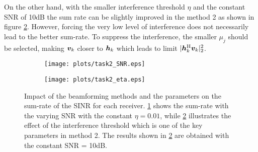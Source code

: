 \documentclass[10pt,a4paper]{article}
\begin{document}
On the other hand, with the smaller interference threshold $\eta$ and the constant SNR of 10dB the sum rate can be slightly improved in the method 2 as shown in figure \ref{fig:task2_eta}. However, forcing the very low level of interference does not necessarily lead to the better sum-rate. To suppress the interference, the smaller $\mu_{j}$ should be selected, making $\bm{v}_{k}$ closer to $\bm{h}_{k}$ which leads to limit $\vert \bm{h}_{k}^{\operatorname{H}} \bm{v}_k \vert_2^{2} $.

\begin{figure}[ht]
	\begin{subfigure}{.5\textwidth}
		\centering
		\texttt{[image: plots/task2\_SNR.eps]}
		\caption{ }
		\label{fig:task2_SNR}
	\end{subfigure}
	\begin{subfigure}{.5\textwidth}
		\centering
		\texttt{[image: plots/task2\_eta.eps]}
		\caption{ }
		\label{fig:task2_eta}
	\end{subfigure}
\caption{Impact of the beamforming methods and the parameters on the sum-rate of the SINR for each receiver. \ref{fig:task2_SNR} shows the sum-rate with the varying SNR with the constant $\eta = 0.01$, while \ref{fig:task2_eta} illustrates the effect of the interference threshold which is one of the key parameters in method 2. The results shown in \ref{fig:task2_eta} are obtained with the constant SNR = 10dB. }
\label{fig:task2}
\end{figure}
\end{document}
